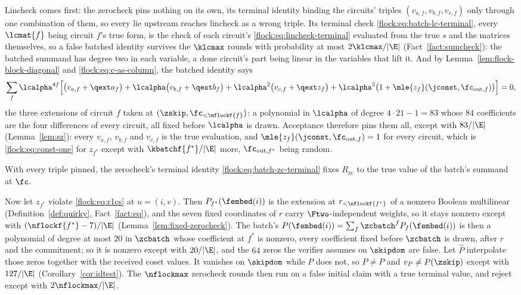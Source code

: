 Lincheck comes first: the zerocheck pins nothing on its own, its terminal identity binding the circuits' triples $(v_{a,f},v_{b,f},v_{c,f})$ only through one combination of them, so every lie upstream reaches lincheck as a wrong triple. Its terminal check \eqref{flock:eq:batch-lc-terminal}, every $\lcmat{f}$ being circuit $f$'s true form, is the check of each circuit's \eqref{flock:eq:lincheck-terminal} evaluated from the true $s$ and the matrices themselves, so a false batched identity survives the $\klcmax$ rounds with probability at most $2\klcmax/|\E|$ (Fact~\ref{fact:sumcheck}): the batched summand has degree two in each variable, a done circuit's part being linear in the variables that lift it. And by Lemma~\ref{lem:flock-block-diagonal} and \eqref{flock:eq:c-as-column}, the batched identity says
\[
\sum_f\lcalpha^{4f}\Bigl[\bigl(v_{a,f}+\qext a_f\bigr)+\lcalpha\bigl(v_{b,f}+\qext b_f\bigr)+\lcalpha^2\bigl(v_{c,f}+\qext z_f\bigr)+\lcalpha^3\bigl(1+\mle{z_f}(\jconst,\fc_{\mathrm{out},f})\bigr)\Bigr]=0,
\]
the three extensions of circuit $f$ taken at $(\zskip,\fc_{<\nflockf{f}})$: a polynomial in $\lcalpha$ of degree $4\cdot21-1=83$ whose $84$ coefficients are the four differences of every circuit, all fixed before $\lcalpha$ is drawn. Acceptance therefore pins them all, except with $83/|\E|$ (Lemma~\ref{lem:sz}): every $v_{a,f}$, $v_{b,f}$ and $v_{c,f}$ is the true evaluation, and $\mle{z_f}(\jconst,\fc_{\mathrm{out},f})=1$ for every circuit, which is \eqref{flock:eq:const-one} for $z_{f^\ast}$ except with $\kbatchf{f^\ast}/|\E|$ more, $\fc_{\mathrm{out},f^\ast}$ being random.

With every triple pinned, the zerocheck's terminal identity \eqref{flock:eq:batch-zc-terminal} fixes $R_{\mathrm{zc}}$ to the true value of the batch's summand at $\fc$.

Now let $z_{f^\ast}$ violate \eqref{flock:eq:r1cs} at $u=(i,v)$. Then $P_{f^\ast}(\fembed(i))$ is the extension at $r_{<\nflockf{f^\ast}}$ of a nonzero Boolean multilinear (Definition~\ref{def:quirky}, Fact~\ref{fact:eq}), and the seven fixed coordinates of $r$ carry $\Ftwo$-independent weights, so it stays nonzero except with $(\nflockf{f^\ast}-7)/|\E|$ (Lemma~\ref{lem:fixed-zerocheck}). The batch's $P(\fembed(i))=\sum_f\zcbatch^fP_f(\fembed(i))$ is then a polynomial of degree at most $20$ in $\zcbatch$ whose coefficient at $f^\ast$ is nonzero, every coefficient fixed before $\zcbatch$ is drawn, after $r$ and the commitment; so it is nonzero except with $20/|\E|$, and the $64$ zeros the verifier assumes on $\skipdom$ are false. Let $\hat P$ interpolate those zeros together with the received coset values. It vanishes on $\skipdom$ while $P$ does not, so $\hat P\neq P$ and $v_P\neq P(\zskip)$ except with $127/|\E|$ (Corollary~\ref{cor:idtest}). The $\nflockmax$ zerocheck rounds then run on a false initial claim with a true terminal value, and reject except with $2\nflockmax/|\E|$.

